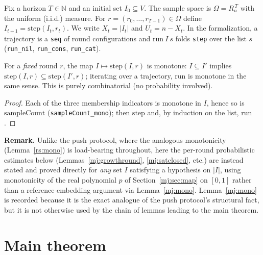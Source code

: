 \begin{definition}[Process]\label{mj:process}
  \rocqok
  Fix a horizon $T \in \mathbb{N}$ and an initial set $I_0 \subseteq V$. The
  sample space is $\Omega = R_n^{\,T}$ with the uniform (i.i.d.) measure. For
  $r = (r_0,\dots,r_{T-1}) \in \Omega$ define $I_{t+1} =
  \mathrm{step}(I_t, r_t)$. We write $X_t = |I_t|$ and $U_t = n - X_t$. In
  the formalization, a trajectory is a \texttt{seq} of round configurations
  and $\mathrm{run}\ I\ s$ folds \texttt{step} over the list $s$
  (\texttt{run\_nil}, \texttt{run\_cons}, \texttt{run\_cat}).
\end{definition}

\begin{lemma}\label{mj:mono}
  \rocqok
  For a \emph{fixed} round $r$, the map $I \mapsto \mathrm{step}(I,r)$ is
  monotone: $I \subseteq I'$ implies $\mathrm{step}(I,r) \subseteq
  \mathrm{step}(I',r)$; iterating over a trajectory, $\mathrm{run}$ is
  monotone in the same sense. This is purely combinatorial (no probability
  involved).
\end{lemma}
\begin{proof}
  \rocqok
  Each of the three membership indicators is monotone in $I$, hence so is
  $\mathrm{sampleCount}$ (\texttt{sampleCount\_mono}); then
  $\mathrm{step}$ and, by induction on the list, $\mathrm{run}$.
\end{proof}

\noindent\textbf{Remark.}
  Unlike the push protocol, where the analogous monotonicity
  (Lemma~\ref{rs:mono}) is load-bearing throughout, here the
  per-round probabilistic estimates below (Lemmas~\ref{mj:growthround},
  \ref{mj:satclosed}, etc.) are instead stated and proved directly for
  \emph{any} set $I$ satisfying a hypothesis on $|I|$, using monotonicity of
  the real polynomial $p$ of Section~\ref{mj:sec:map} on $[0,1]$ rather than
  a reference-embedding argument via Lemma~\ref{mj:mono}.
  Lemma~\ref{mj:mono} is recorded because it is the exact analogue of the
  push protocol's structural fact, but it is not otherwise used by the chain
  of lemmas leading to the main theorem.

\section{Main theorem}\label{mj:sec:main-statement}

